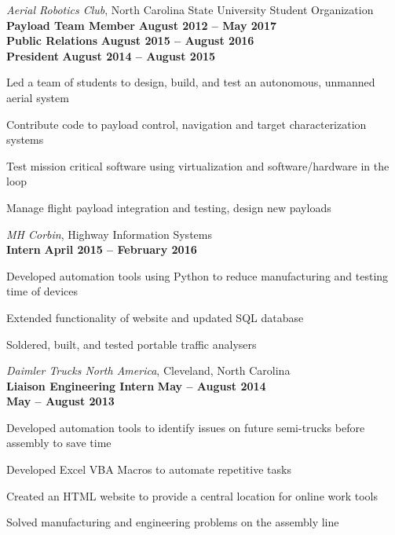 \documentclass[margin,line]{resume}
\begin{document}
\begin{resume}
    \textsl{Aerial Robotics Club}, North Carolina State University Student Organization\\
    \textbf{Payload Team Member} \hfill \textbf{August 2012 -- May 2017}\\
    \textbf{Public Relations} \hfill \textbf{August 2015 -- August 2016}\\
    \textbf{President} \hfill \textbf{August 2014 -- August 2015}\\
    \vspace{-3mm}
    \begin{list2}
    \item Led a team of students to design, build, and test an autonomous, unmanned aerial system
    \item Contribute code to payload control, navigation and target characterization systems
    \item Test mission critical software using virtualization and software/hardware in the loop
    \item Manage flight payload integration and testing, design new payloads
    \end{list2}
    \vspace{3mm}




    \textsl{MH Corbin}, Highway Information Systems\\
    \textbf{Intern}  \hfill \textbf{April 2015 -- February 2016} \\
    \vspace{-4mm}
    \begin{list2}
    \item Developed automation tools using Python to reduce manufacturing and testing time of devices
    \item Extended functionality of website and updated SQL database
    \item Soldered, built, and tested portable traffic analysers
    \end{list2}
    \vspace{3mm}



    \textsl{Daimler Trucks North America}, Cleveland, North Carolina \\
    \textbf{Liaison Engineering Intern} \hfill \textbf{May -- August 2014}\\
    \vspace{1mm}
    \hfill \textbf{May -- August 2013}\\
    \vspace{-4mm}
    \begin{list2}
    \item Developed automation tools to identify issues on future semi-trucks before assembly to save time
    \item Developed Excel VBA Macros to automate repetitive tasks
    \item Created an HTML website to provide a central location for online work tools
    \item Solved manufacturing and engineering problems on the assembly line
    \end{list2}
    \vspace{2mm}

\end{resume}
\end{document}
